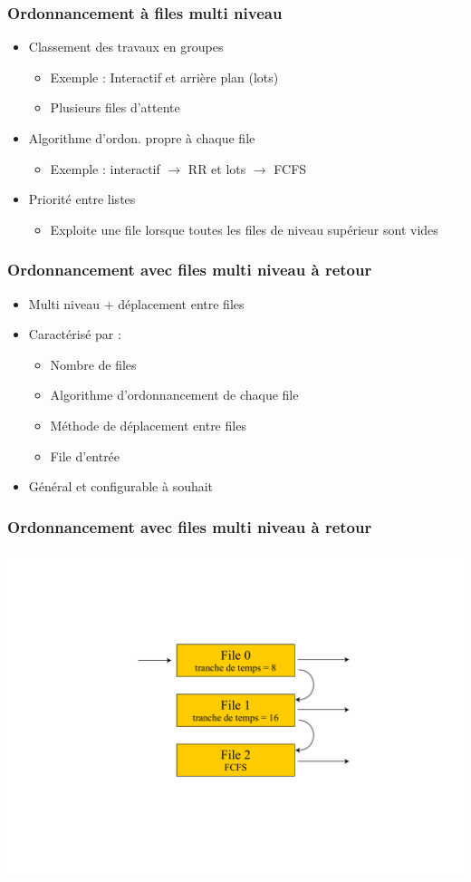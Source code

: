 \begin{frame}
 \frametitle{Ordonnancement à files multi niveau}
 \begin{itemize}
 \item Classement des travaux en groupes
 \begin{itemize}
 \item Exemple : Interactif et arrière plan (lots)
 \item Plusieurs files d’attente
 \end{itemize}
 \item Algorithme d’ordon. propre à chaque file
 \begin{itemize}
 \item Exemple : interactif $\rightarrow$ RR et lots $\rightarrow$ FCFS
 \end{itemize}
 \item Priorité entre listes
 \begin{itemize}
 \item Exploite une file lorsque toutes les files de niveau supérieur sont vides
 \end{itemize}
 \end{itemize}
\end{frame}


\begin{frame}
 \frametitle{Ordonnancement avec files multi niveau à retour}
 \begin{itemize}
 \item Multi niveau + déplacement entre files
 \item Caractérisé par :
 \begin{itemize}
 \item Nombre de files
 \item Algorithme d’ordonnancement de chaque file
 \item Méthode de déplacement entre files
 \item File d’entrée
 \end{itemize}
 \item Général et configurable à souhait
 \end{itemize}
\end{frame}


\begin{frame}
 \frametitle{Ordonnancement avec files multi niveau à retour}
 \includegraphics[width=.8\textwidth]{../illustration/multiniveau_retour.pdf}
\end{frame}



